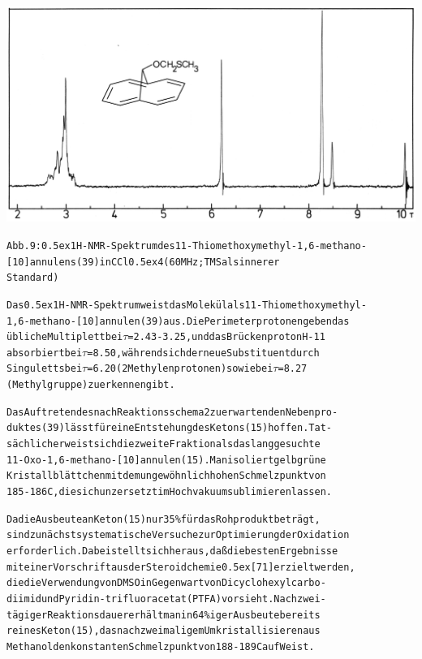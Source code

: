 \documentclass[a4paper,11pt]{article}
\begin{document}
\hspace*{-0.25cm}\includegraphics[width=14.23cm]{NMR_009}
\begin{alltt}
Abb. 9: \raise0.5ex\hbox{1}H-NMR-Spektrum des 11-Thiomethoxymethyl-1,6-methano-
[10]annulens (39) in CCl\lower0.5ex\hbox{4} (60 MHz; TMS als innerer
Standard)

\newpage
{}


Das \raise0.5ex\hbox{1}H-NMR-Spektrum weist das Molekül als 11-Thiomethoxymethyl-
1,6-methano-[10]annulen (39) aus. Die Perimeterprotonen geben das
übliche Multiplett bei \(\tau\) = 2.43 - 3.25, und das Brückenproton H-11
absorbiert bei \(\tau\) = 8.50, während sich der neue Substituent durch
Singuletts bei \(\tau\) = 6.20 (2 Methylenprotonen) sowie bei \(\tau\) = 8.27
(Methylgruppe) zu erkennen gibt.

Das Auftreten des nach Reaktionsschema 2 zu erwartenden Nebenpro-
duktes (39) lässt für eine Entstehung des Ketons (15) hoffen. Tat-
sächlich erweist sich die zweite Fraktion als das lang gesuchte
11-Oxo-1,6-methano-[10]annulen (15). Man isoliert gelbgrüne
Kristallblättchen mit dem ungewöhnlich hohen Schmelzpunkt von
185 - 186\degree{}C, die sich unzersetzt im Hochvakuum sublimieren lassen.

Da die Ausbeute an Keton (15) nur 35 \% für das Rohprodukt beträgt,
sind zunächst systematische Versuche zur Optimierung der Oxidation
erforderlich. Dabei stellt sich heraus, daß die besten Ergebnisse
mit einer Vorschrift aus der Steroidchemie \raise0.5ex\hbox{[71]} erzielt werden,
die die Verwendung von DMSO in Gegenwart von Dicyclohexylcarbo-
diimid und Pyridin-trifluoracetat (PTFA) vorsieht. Nach zwei-
tägiger Reaktionsdauer erhält man in 64 \%iger Ausbeute bereits
reines Keton (15), das nach zweimaligem Umkristallisieren aus
Methanol den konstanten Schmelzpunkt von 188 - 189\degree{}C aufWeist.


\end{alltt}
\end{document}

